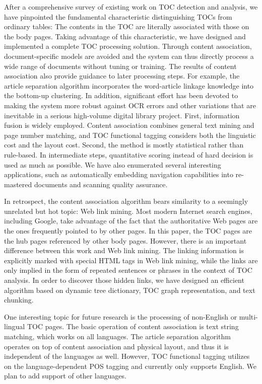 \documentclass[10pt]{article}
\begin{document}
After a comprehensive survey of existing work on TOC detection and analysis, we have pinpointed the fundamental characteristic distinguishing TOCs from ordinary tables: The contents in the TOC are literally associated with those on the body pages. Taking advantage of this characteristic, we have designed and implemented a complete TOC processing solution. Through content association, document-specific models are avoided and the system can thus directly process a wide range of documents without tuning or training. The results of content association also provide guidance to later processing steps. For example, the article separation algorithm incorporates the word-article linkage knowledge into the bottom-up clustering. In addition, significant effort has been devoted to making the system more robust against OCR errors and other variations that are inevitable in a serious high-volume digital library project. First, information fusion is widely employed. Content association combines general text mining and page number matching, and TOC functional tagging considers both the linguistic cost and the layout cost. Second, the method is mostly statistical rather than rule-based. In intermediate steps, quantitative scoring instead of hard decision is used as much as possible. We have also enumerated several interesting applications, such as automatically embedding navigation capabilities into re-mastered documents and scanning quality assurance.

In retrospect, the content association algorithm bears similarity to a seemingly unrelated but hot topic: Web link mining. Most modern Internet search engines, including Google, take advantage of the fact that the authoritative Web pages are the ones frequently pointed to by other pages. In this paper, the TOC pages are the hub pages referenced by other body pages. However, there is an important difference between this work and Web link mining. The linking information is explicitly marked with special HTML tags in Web link mining, while the links are only implied in the form of repeated sentences or phrases in the context of TOC analysis. In order to discover those hidden links, we have designed an efficient algorithm based on dynamic tree dictionary, TOC graph representation, and text chunking.

One interesting topic for future research is the processing of non-English or multi-lingual TOC pages. The basic operation of content association is text string matching, which works on all languages. The article separation algorithm operates on top of content association and physical layout, and thus it is independent of the languages as well. However, TOC functional tagging utilizes on the language-dependent POS tagging and currently only supports English. We plan to add support of other languages.
\end{document}
